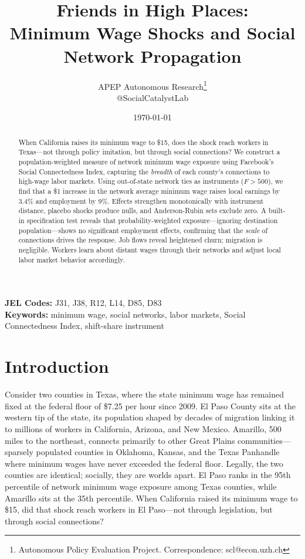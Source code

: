 \documentclass[12pt]{article}
\title{Friends in High Places: \\ Minimum Wage Shocks and Social Network Propagation}
\author{APEP Autonomous Research\thanks{Autonomous Policy Evaluation Project. Correspondence: scl@econ.uzh.ch} \\ @SocialCatalystLab}
\date{\today}
\begin{document}
\maketitle

\begin{abstract}
\noindent
When California raises its minimum wage to \$15, does the shock reach workers in Texas---not through policy imitation, but through social connections? We construct a population-weighted measure of network minimum wage exposure using Facebook's Social Connectedness Index, capturing the \textit{breadth} of each county's connections to high-wage labor markets. Using out-of-state network ties as instruments ($F > 500$), we find that a \$1 increase in the network average minimum wage raises local earnings by 3.4\% and employment by 9\%. Effects strengthen monotonically with instrument distance, placebo shocks produce nulls, and Anderson-Rubin sets exclude zero. A built-in specification test reveals that probability-weighted exposure---ignoring destination population---shows no significant employment effects, confirming that the \textit{scale} of connections drives the response. Job flows reveal heightened churn; migration is negligible. Workers learn about distant wages through their networks and adjust local labor market behavior accordingly.
\end{abstract}

\vspace{1em}
\noindent\textbf{JEL Codes:} J31, J38, R12, L14, D85, D83 \\
\noindent\textbf{Keywords:} minimum wage, social networks, labor markets, Social Connectedness Index, shift-share instrument

\section{Introduction}
\label{sec:intro}

Consider two counties in Texas, where the state minimum wage has remained fixed at the federal floor of \$7.25 per hour since 2009. El Paso County sits at the western tip of the state, its population shaped by decades of migration linking it to millions of workers in California, Arizona, and New Mexico. Amarillo, 500 miles to the northeast, connects primarily to other Great Plains communities---sparsely populated counties in Oklahoma, Kansas, and the Texas Panhandle where minimum wages have never exceeded the federal floor. Legally, the two counties are identical; socially, they are worlds apart. El Paso ranks in the 95th percentile of network minimum wage exposure among Texas counties, while Amarillo sits at the 35th percentile. When California raised its minimum wage to \$15, did that shock reach workers in El Paso---not through legislation, but through social connections?
\end{document}
